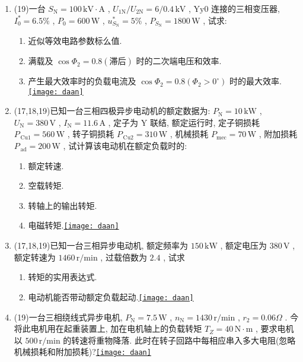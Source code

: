 \documentclass[lang=cn,11pt,marginpar=margintrue]{elegantbook}%
\newcommand{\daan}[1]{\hfill\hyperref[#1]{\texttt{[image: daan]}}}
\newcommand{\zt}[1]{\,\mathrm{#1}}
\newcommand{\NN}{\mathrm{N}}
\begin{document}
\begin{enumerate}
\begin{enumerate}
			\item $U=U_{\NN}$ 条件下, 主磁通减少 $15\%$ , 负载转矩为 $T_{\NN}$ 不变时, 电动机电枢电流与转速是多少?
			\item $U=U_{\NN}$ , $\varPhi=\varPhi_{\NN}$ 条件下, 负载转矩为 $0.8T_{\NN}$ , 转速为 $800\zt{r/min}$ , 电枢回路应串入多大电阻?\daan{js:4}
		\end{enumerate}
	\item (19)一台 $S_{\NN}=100\zt{kV\cdot A}$ , $U_{1\NN}/U_{2\NN}=6/0.4\zt{kV}$ , $\mathrm{Yy}0$ 连接的三相变压器, $I_0^*=6.5\% $ , $P_0=600\zt{W}$ , $u_{S_{\NN}}^*=5\%$ , $P_{S_{\NN}}=1800\zt{W}$ , 试求:
		\begin{enumerate}
			\item 近似等效电路参数标么值.
			\item 满载及 $\cos\varPhi_2=0.8(\text{滞后})$ 时的二次端电压和效率.
			\item 产生最大效率时的负载电流及 $\cos\varPhi_2=0.8(\varPhi_2>0^\circ)$ 时的最大效率.\daan{js:5}
		\end{enumerate}
	\item (17,18,19)已知一台三相四极异步电动机的额定数据为: $P_{\NN}=10\zt{kW}$ , $U_{\NN}=380\zt{V}$ , $I_{\NN}=11.6\zt{A}$ , 定子为 $\mathrm{Y}$  联结, 额定运行时, 定子铜损耗 $P_{\zt{Cu}1}=560\zt{W}$ , 转子铜损耗 $P_{\zt{Cu}2}=310\zt{W}$ , 机械损耗 $P_{\mathrm{mec}}=70\zt{W}$ , 附加损耗 $P_{\zt{ad}}=200\zt{W}$ , 试计算该电动机在额定负载时的:
		\begin{enumerate}
			\item 额定转速.
			\item 空载转矩.
			\item 转轴上的输出转矩.
			\item 电磁转矩.\daan{js:6}
		\end{enumerate}
	\item (17,18,19)已知一台三相异步电动机, 额定频率为 $150\zt{kW}$ , 额定电压为 $380\zt{V}$ , 额定转速为 $1460\zt{r/min}$ , 过载倍数为 $2.4$ , 试求
		\begin{enumerate}
			\item 转矩的实用表达式.
			\item 电动机能否带动额定负载起动.\daan{js:7}
		\end{enumerate}
	\item (19)一台三相绕线式异步电机, $P_{\NN}=7.5\zt{W}$ , $n_{\NN}=1430\zt{r/min}$ , $r_2=0.06\Omega$ . 今将此电机用在起重装置上, 加在电机轴上的负载转矩 $T_Z=40\zt{N\cdot m}$ , 要求电机以 $500\zt{r/min}$ 的转速将重物降落. 此时在转子回路中每相应串入多大电阻(忽略机械损耗和附加损耗)?\daan{js:8}

\end{enumerate}
\end{document}
